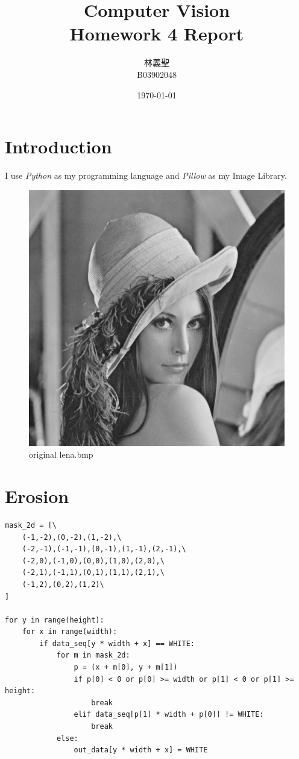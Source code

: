 \documentclass[14pt,a4paper]{extarticle}
\title{Computer Vision\\Homework 4 Report}
\author{林義聖\\B03902048}
\date{\today}
\begin{document}
\maketitle

\section*{Introduction}

I use \textit{Python} as my programming language and \textit{Pillow} as my Image Library.

\begin{figure}[H]
\centering
\includegraphics[scale=0.5]{lena.bmp}
\caption{original lena.bmp}
\label{fig:lena.bmp}
\end{figure}

\section*{Erosion}

\begin{lstlisting}[caption=Erosion]
mask_2d = [\
    (-1,-2),(0,-2),(1,-2),\
    (-2,-1),(-1,-1),(0,-1),(1,-1),(2,-1),\
    (-2,0),(-1,0),(0,0),(1,0),(2,0),\
    (-2,1),(-1,1),(0,1),(1,1),(2,1),\
    (-1,2),(0,2),(1,2)\
]

for y in range(height):
    for x in range(width):
        if data_seq[y * width + x] == WHITE:
            for m in mask_2d:
                p = (x + m[0], y + m[1])
                if p[0] < 0 or p[0] >= width or p[1] < 0 or p[1] >= height:
                    break
                elif data_seq[p[1] * width + p[0]] != WHITE:
                    break
            else:
                out_data[y * width + x] = WHITE
\end{lstlisting}
\end{document}
